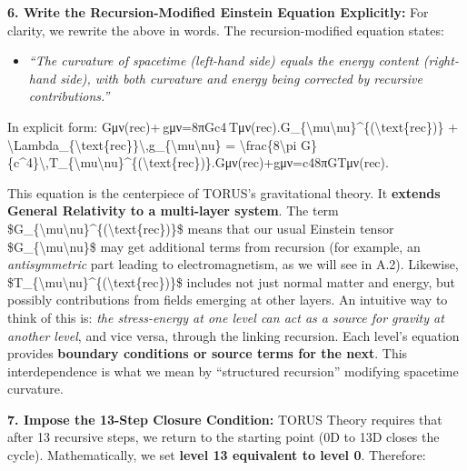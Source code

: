 \documentclass[
]{article}
\begin{document}
\textbf{6. Write the Recursion-Modified Einstein Equation Explicitly:}
For clarity, we rewrite the above in words. The recursion-modified
equation states\hspace{0pt}:

\begin{itemize}
\item
  \emph{``The curvature of spacetime (left-hand side) equals the energy
  content (right-hand side), with both curvature and energy being
  corrected by recursive contributions.''}
\end{itemize}

In explicit form:
Gμν(rec)+\Lambdarec gμν=8πGc4 Tμν(rec).G\_\{\textbackslash mu\textbackslash nu\}\^{}\{(\textbackslash text\{rec\})\}
+
\textbackslash Lambda\_\{\textbackslash text\{rec\}\}\textbackslash,g\_\{\textbackslash mu\textbackslash nu\}
= \textbackslash frac\{8\textbackslash pi
G\}\{c\^{}4\}\textbackslash,T\_\{\textbackslash mu\textbackslash nu\}\^{}\{(\textbackslash text\{rec\})\}.Gμν(rec)\hspace{0pt}+\Lambdarec\hspace{0pt}gμν\hspace{0pt}=c48πG\hspace{0pt}Tμν(rec)\hspace{0pt}.

This equation is the centerpiece of TORUS's gravitational theory. It
\textbf{extends General Relativity to a multi-layer system}. The term
\$G\_\{\textbackslash mu\textbackslash nu\}\^{}\{(\textbackslash text\{rec\})\}\$
means that our usual Einstein tensor
\$G\_\{\textbackslash mu\textbackslash nu\}\$ may get additional terms
from recursion (for example, an \emph{antisymmetric} part leading to
electromagnetism, as we will see in A.2). Likewise,
\$T\_\{\textbackslash mu\textbackslash nu\}\^{}\{(\textbackslash text\{rec\})\}\$
includes not just normal matter and energy, but possibly contributions
from fields emerging at other layers. An intuitive way to think of this
is: \emph{the stress-energy at one level can act as a source for gravity
at another level}, and vice versa, through the linking recursion. Each
level's equation provides \textbf{boundary conditions or source terms
for the next}\hspace{0pt}. This interdependence is what we mean by
``structured recursion'' modifying spacetime curvature.

\textbf{7. Impose the 13-Step Closure Condition:} TORUS Theory requires
that after 13 recursive steps, we return to the starting point (0D to
13D closes the cycle). Mathematically, we set \textbf{level 13
equivalent to level 0}. Therefore:
\end{document}

